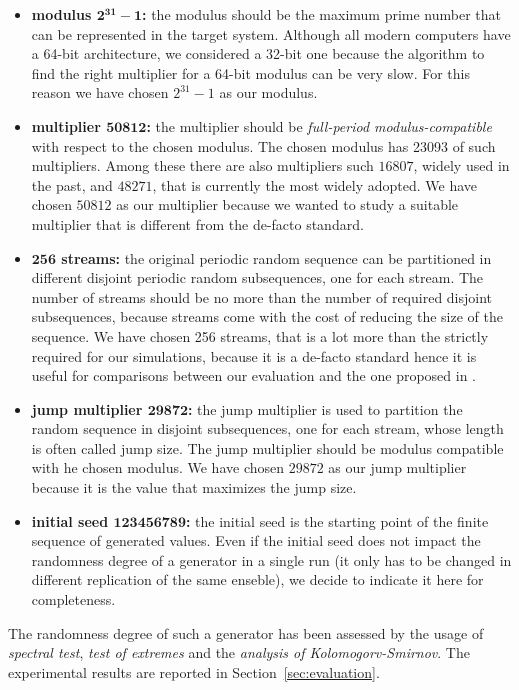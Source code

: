 \begin{itemize}
	\item \textbf{modulus $\mathbf{2^{31}-1}$:} the modulus should be the maximum prime number that can be represented in the target system. 
	Although all modern computers have a 64-bit architecture, we considered a 32-bit one because the algorithm to find the right multiplier for a 64-bit modulus can be very slow.
	For this reason we have chosen $2^{31}-1$ as our modulus.
	
	\item \textbf{multiplier $\mathbf{50812}$:} the multiplier should be \textit{full-period modulus-compatible} with respect to the chosen modulus. The chosen modulus has 23093 of such multipliers. Among these there are also multipliers such $16807$, widely used in the past, and $48271$, that is currently the most widely adopted.
	We have chosen $50812$ as our multiplier because we wanted to study a suitable multiplier that is different from the de-facto standard.
	
	\item \textbf{$\mathbf{256}$ streams:} the original periodic random sequence can be partitioned in different disjoint periodic random subsequences, one for each stream. 
	The number of streams should be no more than the number of required disjoint subsequences, because streams come with the cost of reducing the size of the sequence.
	We have chosen 256 streams, that is a lot more than the strictly required for our simulations, because it is a de-facto standard hence it is useful for comparisons between our evaluation and the one proposed in \cite{leemis2006discrete}.
	
	\item \textbf{jump multiplier $\mathbf{29872}$:} the jump multiplier is used to partition the random sequence in disjoint subsequences, one for each stream, whose length is often called jump size. The jump multiplier should be modulus compatible with he chosen modulus.
	We have chosen $29872$ as our jump multiplier because it is the value that maximizes the jump size.
	
	\item \textbf{initial seed $\mathbf{123456789}$:} the initial seed is the starting point of the finite sequence of generated values. Even if the initial seed does not impact the randomness degree of a generator in a single run (it only has to be changed in different replication of the same enseble), we decide to indicate it here for completeness. 
\end{itemize}

The randomness degree of such a generator has been assessed by the usage of \textit{spectral test}, \textit{test of extremes} and the \textit{analysis of Kolomogorv-Smirnov}.
%
The experimental results are reported in Section~\ref{sec:evaluation}.
